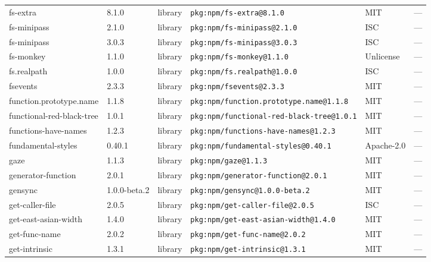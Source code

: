 \documentclass[11pt,a4paper]{article}
\begin{document}
\begin{longtable}{|p{4cm}|p{2cm}|p{1.6cm}|p{5cm}|p{1.5cm}|p{3.5cm}|}
\raggedright fs-extra & 8.1.0 & library & \small\texttt{pkg:npm/fs-extra@8.1.0} & MIT & \small — \\
\raggedright fs-minipass & 2.1.0 & library & \small\texttt{pkg:npm/fs-minipass@2.1.0} & ISC & \small — \\
\raggedright fs-minipass & 3.0.3 & library & \small\texttt{pkg:npm/fs-minipass@3.0.3} & ISC & \small — \\
\raggedright fs-monkey & 1.1.0 & library & \small\texttt{pkg:npm/fs-monkey@1.1.0} & Unlicense & \small — \\
\raggedright fs.realpath & 1.0.0 & library & \small\texttt{pkg:npm/fs.realpath@1.0.0} & ISC & \small — \\
\raggedright fsevents & 2.3.3 & library & \small\texttt{pkg:npm/fsevents@2.3.3} & MIT & \small — \\
\raggedright function.prototype.name & 1.1.8 & library & \small\texttt{pkg:npm/function.prototype.name@1.1.8} & MIT & \small — \\
\raggedright functional-red-black-tree & 1.0.1 & library & \small\texttt{pkg:npm/functional-red-black-tree@1.0.1} & MIT & \small — \\
\raggedright functions-have-names & 1.2.3 & library & \small\texttt{pkg:npm/functions-have-names@1.2.3} & MIT & \small — \\
\raggedright fundamental-styles & 0.40.1 & library & \small\texttt{pkg:npm/fundamental-styles@0.40.1} & Apache-2.0 & \small — \\
\raggedright gaze & 1.1.3 & library & \small\texttt{pkg:npm/gaze@1.1.3} & MIT & \small — \\
\raggedright generator-function & 2.0.1 & library & \small\texttt{pkg:npm/generator-function@2.0.1} & MIT & \small — \\
\raggedright gensync & 1.0.0-beta.2 & library & \small\texttt{pkg:npm/gensync@1.0.0-beta.2} & MIT & \small — \\
\raggedright get-caller-file & 2.0.5 & library & \small\texttt{pkg:npm/get-caller-file@2.0.5} & ISC & \small — \\
\raggedright get-east-asian-width & 1.4.0 & library & \small\texttt{pkg:npm/get-east-asian-width@1.4.0} & MIT & \small — \\
\raggedright get-func-name & 2.0.2 & library & \small\texttt{pkg:npm/get-func-name@2.0.2} & MIT & \small — \\
\raggedright get-intrinsic & 1.3.1 & library & \small\texttt{pkg:npm/get-intrinsic@1.3.1} & MIT & \small — \\

\end{longtable}
\end{document}
